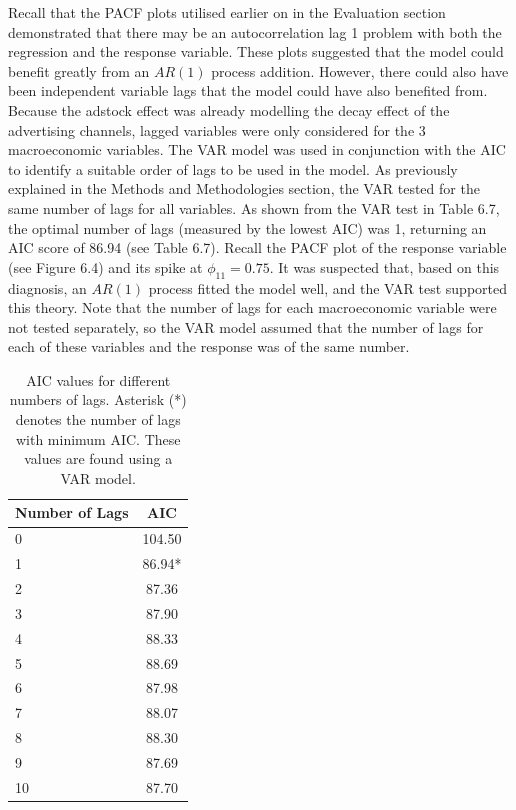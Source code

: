 \documentclass[11pt, a4paper]{article}
\begin{document}
Recall that the PACF plots utilised earlier on in the Evaluation section demonstrated that there may be an autocorrelation lag 1 problem with both the regression and the response variable. These plots suggested that the model could benefit greatly from an $AR(1)$ process addition. However, there could also have been independent variable lags that the model could have also benefited from. Because the adstock effect was already modelling the decay effect of the advertising channels, lagged variables were only considered for the 3 macroeconomic variables. The VAR model was used in conjunction with the AIC to identify a suitable order of lags to be used in the model. As previously explained in the Methods and Methodologies section, the VAR tested for the same number of lags for all variables. As shown from the VAR test in Table 6.7, the optimal number of lags  (measured by the lowest AIC) was 1, returning an AIC score of 86.94 (see Table 6.7). Recall the PACF plot of the response variable (see Figure 6.4) and its spike at $\phi_{11} = 0.75$. It was suspected that, based on this diagnosis, an $AR(1)$ process fitted the model well, and the VAR test supported this theory. Note that the number of lags for each macroeconomic variable were not tested separately, so the VAR model assumed that the number of lags for each of these variables and the response was of the same number. 
\begin{table}[h!]
    \centering
    \begin{tabular}{lc}
        \toprule
        \textbf{Number of Lags} & \textbf{AIC} \\
        \midrule
        0  & 104.50 \\
        1  & 86.94* \\
        2  & 87.36 \\
        3  & 87.90 \\
        4  & 88.33 \\
        5  & 88.69 \\
        6  & 87.98 \\
        7  & 88.07 \\
        8  & 88.30 \\
        9  & 87.69 \\
        10 & 87.70 \\
        \bottomrule
    \end{tabular}
    \caption{AIC values for different numbers of lags. Asterisk (*) denotes the number of lags with minimum AIC. These values are found using a VAR model.}
    \label{tab:lag_aic}
\end{table}
\end{document}

